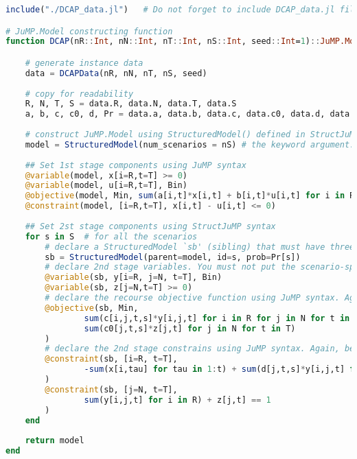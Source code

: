 \documentclass[11pt]{article}
\begin{document}
\begin{lstlisting}[frame=single,language=julia]
include("./DCAP_data.jl")	# Do not forget to include DCAP_data.jl file we defined above

# JuMP.Model constructing function
function DCAP(nR::Int, nN::Int, nT::Int, nS::Int, seed::Int=1)::JuMP.Model

	# generate instance data
	data = DCAPData(nR, nN, nT, nS, seed)
	
	# copy for readability
	R, N, T, S = data.R, data.N, data.T, data.S
	a, b, c, c0, d, Pr = data.a, data.b, data.c, data.c0, data.d, data.Pr
	
	# construct JuMP.Model using StructuredModel() defined in StructJuMP package
	model = StructuredModel(num_scenarios = nS)	# the keyword argument: num_scenarios = nS
	
	## Set 1st stage components using JuMP syntax
	@variable(model, x[i=R,t=T] >= 0)
	@variable(model, u[i=R,t=T], Bin)
	@objective(model, Min, sum(a[i,t]*x[i,t] + b[i,t]*u[i,t] for i in R for t in T))
	@constraint(model, [i=R,t=T], x[i,t] - u[i,t] <= 0)
	
	## Set 2st stage components using StructJuMP syntax
	for s in S	# for all the scenarios
		# declare a StructuredModel `sb' (sibling) that must have three keyword arguments: parent=model (defined above), id=s, prob=Pr[s]
		sb = StructuredModel(parent=model, id=s, prob=Pr[s])	
		# declare 2nd stage variables. You must not put the scenario-specific index for the 2nd stage variables. They are internally distiguished by `id' (one of the keyword arguments of StructuredModel()).
		@variable(sb, y[i=R, j=N, t=T], Bin)
		@variable(sb, z[j=N,t=T] >= 0)
		# declare the recourse objective function using JuMP syntax. Again, you don't need to worry about taking expectation. But, be very careful about indices of the scenario data containers (i.e., c[i,j,t,s] and c0[j,t,s]). They need to be explicit since they are not members of StructuredModel.
		@objective(sb, Min, 
				sum(c[i,j,t,s]*y[i,j,t] for i in R for j in N for t in T) +
				sum(c0[j,t,s]*z[j,t] for j in N for t in T)
		)
		# declare the 2nd stage constrains using JuMP syntax. Again, be very careful about indices of the scenario data container (i.e., d[j,t,s])
		@constraint(sb, [i=R, t=T], 
				-sum(x[i,tau] for tau in 1:t) + sum(d[j,t,s]*y[i,j,t] for j in N) <= 0
		)
		@constraint(sb, [j=N, t=T], 
				sum(y[i,j,t] for i in R) + z[j,t] == 1
		)
	end
	
	return model
end

\end{lstlisting}
	
\end{document}
